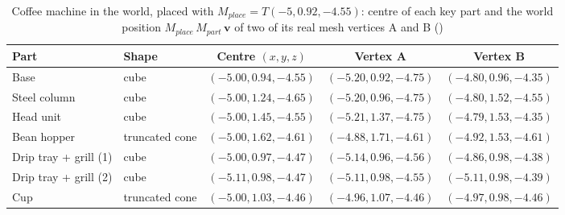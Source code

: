 \begin{table}[H]\centering\footnotesize
\caption{Coffee machine in the world, placed with $M_{place}=T(-5, 0.92, -4.55)$: centre of each key part and the world position $M_{place}\,M_{part}\,\mathbf{v}$ of two of its real mesh vertices A and B ()}\label{tab:world_coffee}
\begin{tabular}{@{}l l c c c@{}}
\toprule
Part & Shape & Centre $(x,y,z)$ & Vertex A & Vertex B \\
\midrule
Base & cube & $(-5.00, 0.94, -4.55)$ & $(-5.20, 0.92, -4.75)$ & $(-4.80, 0.96, -4.35)$ \\
Steel column & cube & $(-5.00, 1.24, -4.65)$ & $(-5.20, 0.96, -4.75)$ & $(-4.80, 1.52, -4.55)$ \\
Head unit & cube & $(-5.00, 1.45, -4.55)$ & $(-5.21, 1.37, -4.75)$ & $(-4.79, 1.53, -4.35)$ \\
Bean hopper & truncated cone & $(-5.00, 1.62, -4.61)$ & $(-4.88, 1.71, -4.61)$ & $(-4.92, 1.53, -4.61)$ \\
Drip tray + grill (1) & cube & $(-5.00, 0.97, -4.47)$ & $(-5.14, 0.96, -4.56)$ & $(-4.86, 0.98, -4.38)$ \\
Drip tray + grill (2) & cube & $(-5.11, 0.98, -4.47)$ & $(-5.11, 0.98, -4.55)$ & $(-5.11, 0.98, -4.39)$ \\
Cup & truncated cone & $(-5.00, 1.03, -4.46)$ & $(-4.96, 1.07, -4.46)$ & $(-4.97, 0.98, -4.46)$ \\
\bottomrule
\end{tabular}
\end{table}
